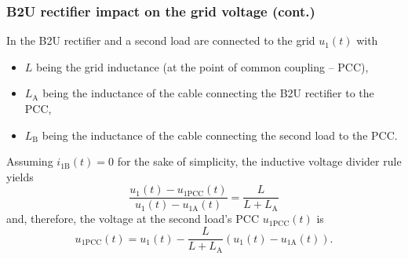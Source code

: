\begin{frame}
    \frametitle{B2U rectifier impact on the grid voltage (cont.)}
    In  the B2U rectifier and a second load are connected to the grid $u_1(t)$ with
    \begin{itemize}
        \item $L$ being the grid inductance (at the point of common coupling -- PCC),\pause
        \item $L_\mathrm{A}$ being the inductance of the cable connecting the B2U rectifier to the PCC,\pause
        \item $L_\mathrm{B}$ being the inductance of the cable connecting the second load to the PCC.\pause
    \end{itemize}
    Assuming $i_{1\mathrm{B}}(t)=0$ for the sake of simplicity, the inductive voltage divider rule yields
    \begin{equation}
        \frac{u_1(t)-u_{1\mathrm{PCC}}(t)}{u_1(t)-u_{1\mathrm{A}}(t)} = \frac{L}{L+L_\mathrm{A}} 
    \end{equation}\pause
    and, therefore, the voltage at the second load's PCC $u_{1\mathrm{PCC}}(t)$ is
    \begin{equation}
        u_{1\mathrm{PCC}}(t) = u_1(t) - \frac{L}{L+L_\mathrm{A}}(u_1(t)-u_{1\mathrm{A}}(t)).
    \end{equation}
\end{frame}

